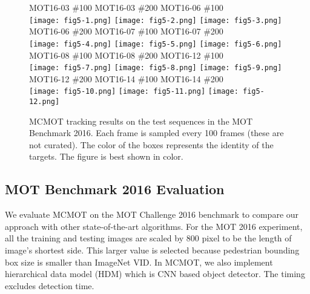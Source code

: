\documentclass[runningheads]{llncs}
\begin{document}
\begin{figure}[t!]
\centering
\hspace{0.15in} MOT16-03 \#100 \hspace{0.8in} MOT16-03 \#200 \hspace{0.5in} MOT16-06 \#100 \\
\texttt{[image: fig5-1.png]}
\texttt{[image: fig5-2.png]}
\texttt{[image: fig5-3.png]} \\
MOT16-06 \#200 \hspace{0.5in} MOT16-07 \#100 \hspace{0.7in} MOT16-07 \#200 ~~~~~~ \\
\texttt{[image: fig5-4.png]}
\texttt{[image: fig5-5.png]}
\texttt{[image: fig5-6.png]} \\
MOT16-08 \#100 \hspace{0.6in} MOT16-08 \#200 \hspace{0.6in} MOT16-12 \#100 \\
\texttt{[image: fig5-7.png]}
\texttt{[image: fig5-8.png]}
\texttt{[image: fig5-9.png]} \\
MOT16-12 \#200 \hspace{0.6in} MOT16-14 \#100 \hspace{0.6in} MOT16-14 \#200 \\
\texttt{[image: fig5-10.png]}
\texttt{[image: fig5-11.png]}
\texttt{[image: fig5-12.png]}
\caption{MCMOT tracking results on the test sequences in the MOT Benchmark 2016. Each frame is sampled every 100 frames (these are not curated). The color of the boxes represents the identity of the targets. The figure is best shown in color.}
\label{fig:5}
\end{figure}

\subsection{MOT Benchmark 2016 Evaluation}

We evaluate MCMOT on the MOT Challenge 2016 benchmark to compare our approach with other state-of-the-art algorithms. For the MOT 2016 experiment, all the training and testing images are scaled by 800 pixel to be the length of image's shortest side. This larger value is selected because pedestrian bounding box size is smaller than ImageNet VID. In MCMOT, we also implement hierarchical data model (HDM) \cite{HDM} which is CNN based object detector. The timing excludes detection time.
\end{document}

